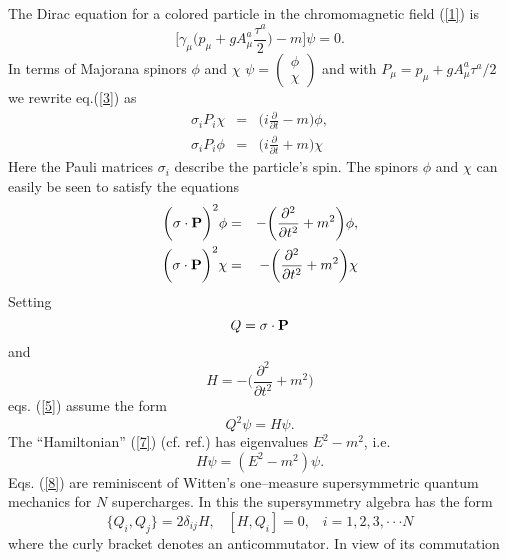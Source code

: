 \documentclass[a4paper,12pt,a4]{article}
\begin{document}
The Dirac equation for a colored
particle in the
chromomagnetic field (\ref{1}) is 
\begin{equation}
\bigg[\gamma_{\mu}\bigg(p_{\mu}+gA^a_{\mu}\frac{{\tau}^a}
{2}\bigg)-m\bigg]\psi=0.
\label{3}
\end{equation}
In terms of
Majorana spinors $\phi$ and $\chi$ $\psi =\left(
\begin{array}{c}\phi\\\chi \end{array}\right)$ and
with
$P_{\mu}=p_{\mu}+gA^a_{\mu}{\tau}^a/2$
we rewrite eq.(\ref{3}) as
\begin{eqnarray}
\sigma_i P_i\chi
 &=& \bigg(i\frac{\partial}{\partial t}-m
\bigg)\phi,\nonumber\\
\sigma_i P_i\phi &=& 
\bigg(i\frac{\partial}{\partial t}+m
\bigg)\chi
\label{4}
\end{eqnarray}
Here the Pauli matrices $ \sigma_i$ describe the particle's spin.
The spinors $\phi$ and $\chi$
can easily be seen to satisfy the equations
\begin{eqnarray}
\bigg({\bf \sigma}\cdot{\bf P}\bigg)^2\phi &=&
-\bigg(\frac{\partial^2}{\partial t^2}+m^2\bigg)\phi,\nonumber\\
\bigg({\bf \sigma}\cdot{\bf P}\bigg)^2\chi &=&
-\bigg(\frac{\partial^2}{\partial t^2}+m^2\bigg)\chi
\label{5}
\end{eqnarray}
Setting
\begin {equation}
Q={\bf \sigma}\cdot{\bf P}
\label{6}
\end{equation}
and
\begin{equation}
H=-\bigg(\frac{\partial^2}{\partial t^2} + m^2\bigg)
\label{7}
\end{equation}
eqs. (\ref{5}) assume the form
\begin{equation}
Q^2\psi = H\psi.
\label{8}
\end{equation}
The ``Hamiltonian'' (\ref{7}) (cf. ref.\cite{2})
 has eigenvalues $E^2-m^2$, i.e.
\begin{equation}
H\psi = (E^2-m^2)\psi.
\label{9}
\end{equation}
Eqs. (\ref{8}) are reminiscent of Witten's one--measure
supersymmetric quantum mechanics \cite{1}
for $N$ supercharges. In
this the supersymmetry algebra
has the form
\begin{equation}
\{Q_i, Q_j\}= 2\delta_{ij}H, \;\;\;
 [H, Q_i]=0, \;\;\; i=1, 2, 3, \cdot\cdot\cdot N
\label{10}
\end{equation}
where the curly bracket denotes an anticommutator.
In view of its commutation
\end{document}
